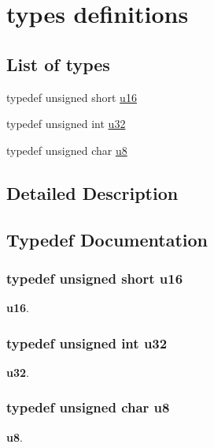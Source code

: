 \hypertarget{group___u_c_l___t_y_p_e_s}{\section{types definitions}
\label{group___u_c_l___t_y_p_e_s}
}
\subsection*{List of types}
\begin{DoxyCompactItemize}
\item
typedef unsigned short \hyperlink{group___u_c_l___t_y_p_e_s_ga9e6c91d77e24643b888dbd1a1a590054}{u16}
\item
typedef unsigned int \hyperlink{group___u_c_l___t_y_p_e_s_ga10e94b422ef0c20dcdec20d31a1f5049}{u32}
\item
typedef unsigned char \hyperlink{group___u_c_l___t_y_p_e_s_gaed742c436da53c1080638ce6ef7d13de}{u8}
\end{DoxyCompactItemize}


\subsection{Detailed Description}


\subsection{Typedef Documentation}
\hypertarget{group___u_c_l___t_y_p_e_s_ga9e6c91d77e24643b888dbd1a1a590054}{
\subsubsection[{u16}]{\setlength{\rightskip}{0pt plus 5cm}typedef unsigned short {\bf u16}}}\label{group___u_c_l___t_y_p_e_s_ga9e6c91d77e24643b888dbd1a1a590054}
{\bfseries u16}. \hypertarget{group___u_c_l___t_y_p_e_s_ga10e94b422ef0c20dcdec20d31a1f5049}{
\subsubsection[{u32}]{\setlength{\rightskip}{0pt plus 5cm}typedef unsigned int {\bf u32}}}\label{group___u_c_l___t_y_p_e_s_ga10e94b422ef0c20dcdec20d31a1f5049}
{\bfseries u32}. \hypertarget{group___u_c_l___t_y_p_e_s_gaed742c436da53c1080638ce6ef7d13de}{
\subsubsection[{u8}]{\setlength{\rightskip}{0pt plus 5cm}typedef unsigned char {\bf u8}}}\label{group___u_c_l___t_y_p_e_s_gaed742c436da53c1080638ce6ef7d13de}
{\bfseries u8}. 